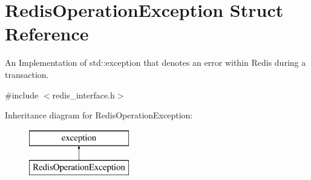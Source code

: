 \hypertarget{structRedisOperationException}{\section{Redis\-Operation\-Exception Struct Reference}
\label{structRedisOperationException}
}


An Implementation of std\-::exception that denotes an error within Redis during a transaction.  




{\ttfamily \#include $<$redis\-\_\-interface.\-h$>$}

Inheritance diagram for Redis\-Operation\-Exception\-:\begin{figure}[H]
\begin{center}
\leavevmode
\includegraphics[height=2.000000cm]{structRedisOperationException}
\end{center}
\end{figure}
